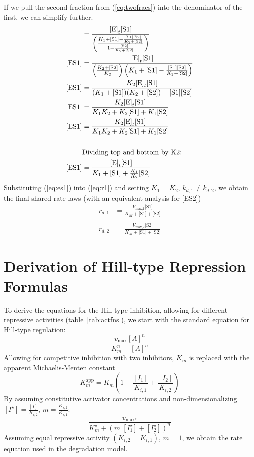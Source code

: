 If we pull the second fraction from (\ref{eq:twofracs}) into the denominator of the first, we can simplify further.
\begin{align}
  [\text{ES1}] &= \frac{\text{[E]}_t \text{[S1]}}{\left(\frac{K_1 + \text{[S1]} - \frac{\text{[S1]} \text{[S2]}}{K_2 + \text{[S2]}}}{1 - \frac{\text{[S2]}}{K_2 + \text{[S2]}}}\right)} \notag\\
  [\text{ES1}] &= \frac{\text{[E]}_t \text{[S1]}}{\left(\frac{K_2 + \text{[S2]}}{K_2}\right) \left(K_1 + \text{[S1]} - \frac{\text{[S1]} \text{[S2]}}{K_2 + \text{[S2]}}\right)} \notag\\
  [\text{ES1}] &= \frac{K_2 \text{[E]}_t \text{[S1]}}{(K_1 + \text{[S1]})(K_2 + \text{[S2]}) - \text{[S1]}\text{[S2]}} \notag\\
  [\text{ES1}] &= \frac{K_2 \text{[E]}_t \text{[S1]}}{K_1 K_2 + K_2\text{[S1]} + K_1\text{[S2]}} \notag\\
  [\text{ES1}] &= \frac{K_2 \text{[E]}_t \text{[S1]}}{K_1 K_2 + K_2\text{[S1]} + K_1\text{[S2]}} \notag\\ \notag\\
  & \text{Dividing top and bottom by K2:} \notag\\
  [\text{ES1}] &= \frac{\text{[E]}_t \text{[S1]}}{K_1 + \text{[S1]} + \frac{K_1}{K_2}\text{[S2]}}\label{eq:es1}
\end{align}
Substituting (\ref{eq:es1}) into (\ref{eq:r1}) and setting $K_1 = K_2$, $k_{d,1} \neq k_{d,2}$, we obtain the final shared rate laws (with an equivalent analysis for [ES2])
\begin{align*}
  r_{d,1} &= \frac{V_\text{max,1} \text{[S1]}}{K_M + \text{[S1]} + \text{[S2]}} \\ \\
  r_{d,2} &= \frac{V_\text{max,2} \text{[S2]}}{K_M + \text{[S1]} + \text{[S2]}}
\end{align*}

\section{Derivation of Hill-type Repression Formulas}
To derive the equations for the Hill-type inhibition, allowing for different repressive activities (table~\ref{tab:actfns}), we start with the standard equation for Hill-type regulation:
\begin{equation} \label{eq:htr}
  \frac{v_{\text{max}}[A]^n}{K_m^n + [A]^n}
\end{equation}
Allowing for competitive inhibition with two inhibitors, $K_m$ is replaced with the apparent Michaelis-Menten constant
\begin{equation}\label{eq:kmapp}
  K_m^{\text{app}} = K_m \left(1 + \frac{[I_1]}{K_{i,1}} + \frac{[I_2]}{K_{i,2}}\right)
\end{equation}
By assuming constitutive activator concentrations and non-dimensionalizing $[I^{\star}] = \frac{[I]}{K_{i,2}}$, $m = \frac{K_{i,2}}{K_{i,1}}$:
\begin{equation*}
  \frac{v_{\text{max}^{\star}}}{K_m^{\star} + \left(m \; [I^{\star}_1] + [I^{\star}_2]\right)^n}
\end{equation*}
Assuming equal repressive activity $(K_{i,2} = K_{i,1})$, $m = 1$, we obtain the rate equation used in the degradation model.


